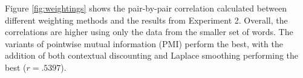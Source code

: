 \documentclass[11pt]{article}
\begin{document}
Figure \ref{fig:weightings} shows the pair-by-pair correlation calculated between different weighting methods and the results from Experiment 2. Overall, the correlations are higher using only the data from the smaller set of words. The variants of pointwise mutual information (PMI) perform the best, with the addition of both contextual discounting and Laplace smoothing performing the best ($r = .5397$).

\begin{figure}[ht]
\begin{center}
~
  

\end{center}
\end{figure}
\end{document}
